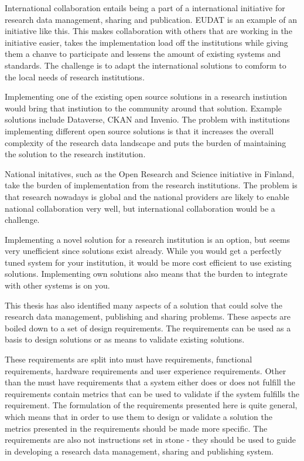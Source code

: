 International collaboration entails being a part of a international initiative
for research data management, sharing and publication. EUDAT is an example of
an initiative like this. This makes collaboration with others that are working
in the initiative easier, takes the implementation load off the institutions
while giving them a chanve to participate and lessens the amount of existing
systems and standards. The challenge is to adapt the international solutions
to comform to the local needs of research institutions.

Implementing one of the existing open source solutions in a research
instiution would bring that instiution to the community around that solution.
Example solutions include Dataverse, CKAN and Invenio. The problem with institutions
implementing different open source solutions is that it increases the overall
complexity of the research data landscape and puts the burden of maintaining
the solution to the research institution.

National initatives, such as the Open Research and Science initiative in Finland,
take the burden of implementation from the research institutions. The problem is that
research nowadays is global and the national providers are likely to enable national
collaboration very well, but international collaboration would be a challenge.

Implementing a novel solution for a research institution is an option, but seems
very unefficient since solutions exist already. While you would get a perfectly
tuned system for your institution, it would be more cost efficient to use existing
solutions. Implementing own solutions also means that the burden to integrate with
other systems is on you.

This thesis has also identified many aspects of a solution that could solve the
research data management, publishing and sharing problems. These aspects are
boiled down to a set of design requirements. The requirements
can be used as a basis to design solutions or as means to validate existing
solutions.

These requirements are split into
must have requirements, functional requirements, hardware requirements and
user experience requirements. Other than the must have requirements that a
system either does or does not fulfill the requirements contain metrics that
can be used to validate if the system fulfills the requirement. The formulation
of the requirements presented here is quite general,
which means that in order to use them to design or validate a solution the metrics
presented in the requirements should be made more specific. The requirements
are also not instructions set in stone - they should be used to guide in
developing a research data management, sharing and publishing system.

